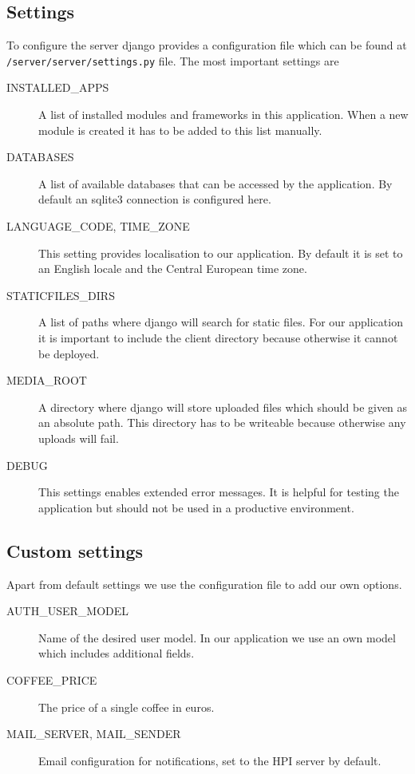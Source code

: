 \subsection{Settings}\label{settings}

To configure the server django provides a configuration file which can
be found at \texttt{/server/server/settings.py} file. The most important settings are

\begin{description}
\item[INSTALLED\_APPS] A list of installed modules and frameworks in
this application. When a new module is created it has to be added to
this list manually.

\item[DATABASES] A list of available databases that can be accessed
by the application. By default an sqlite3 connection is configured here.

\item[LANGUAGE\_CODE, TIME\_ZONE] This setting provides localisation
to our application. By default it is set to an English locale and the
Central European time zone.

\item[STATICFILES\_DIRS] A list of paths where django will search for
static files. For our application it is important to include the client
directory because otherwise it cannot be deployed.

\item[MEDIA\_ROOT] A directory where django will store uploaded files
which should be given as an absolute path. This directory has to be
writeable because otherwise any uploads will fail.

\item[DEBUG] This settings enables extended error messages. It is
helpful for testing the application but should not be used in a
productive environment.
\end{description}

\subsection{Custom settings}\label{custom-settings}

Apart from default settings we use the configuration file to add our own
options.

\begin{description}
\item[AUTH\_USER\_MODEL] Name of the desired user model. In our
application we use an own model which includes additional fields.

\item[COFFEE\_PRICE] The price of a single coffee in euros.

\item[MAIL\_SERVER, MAIL\_SENDER] Email configuration for
notifications, set to the HPI server by default.
\end{description}

